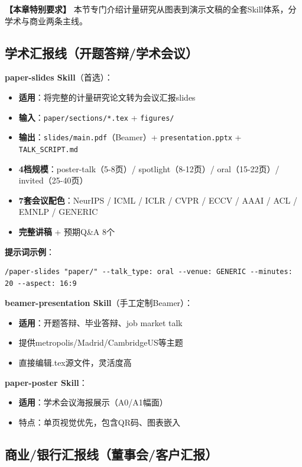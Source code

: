 \textbf{【本章特别要求】} 本节专门介绍计量研究从图表到演示文稿的全套Skill体系，分学术与商业两条主线。

\subsection{学术汇报线（开题答辩/学术会议）}

\textbf{paper-slides Skill}（首选）：
\begin{itemize}[leftmargin=1em]
  \item \textbf{适用}：将完整的计量研究论文转为会议汇报slides
  \item \textbf{输入}：\texttt{paper/sections/*.tex} + \texttt{figures/}
  \item \textbf{输出}：\texttt{slides/main.pdf}（Beamer）+ \texttt{presentation.pptx} + \texttt{TALK\_SCRIPT.md}
  \item \textbf{4档规模}：poster-talk（5-8页）/ spotlight（8-12页）/ oral（15-22页）/ invited（25-40页）
  \item \textbf{7套会议配色}：NeurIPS / ICML / ICLR / CVPR / ECCV / AAAI / ACL / EMNLP / GENERIC
  \item \textbf{完整讲稿} + 预期Q\&A 8个
\end{itemize}

\textbf{提示词示例}：
\begin{lstlisting}
/paper-slides "paper/" --talk_type: oral --venue: GENERIC --minutes: 20 --aspect: 16:9
\end{lstlisting}

\textbf{beamer-presentation Skill}（手工定制Beamer）：
\begin{itemize}[leftmargin=1em]
  \item \textbf{适用}：开题答辩、毕业答辩、job market talk
  \item 提供metropolis/Madrid/CambridgeUS等主题
  \item 直接编辑.tex源文件，灵活度高
\end{itemize}

\textbf{paper-poster Skill}：
\begin{itemize}[leftmargin=1em]
  \item \textbf{适用}：学术会议海报展示（A0/A1幅面）
  \item 特点：单页视觉优先，包含QR码、图表嵌入
\end{itemize}

\subsection{商业/银行汇报线（董事会/客户汇报）}

